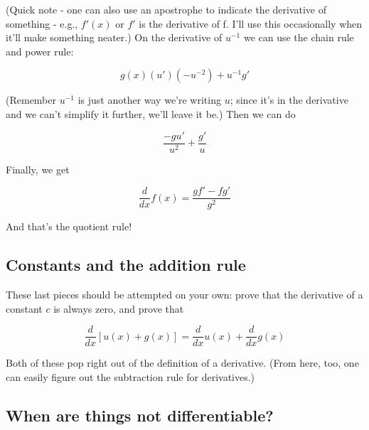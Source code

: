 (Quick note - one can also use an apostrophe to indicate the derivative of something - e.g., $f'(x)$ or $f'$ is the derivative of f. I'll use this occasionally when it'll make something neater.) On the derivative of $u^{-1}$ we can use the chain rule and power rule:

\begin{equation*}
    g(x)(u')(-u^{-2})+u^{-1}g'
\end{equation*}

(Remember $u^{-1}$ is just another way we're writing $u$; since it's in the derivative and we can't simplify it further, we'll leave it be.) Then we can do

\begin{equation*}
    \frac{-gu'}{u^2}+\frac{g'}{u}
\end{equation*}

Finally, we get

\begin{equation*}
    \frac{d}{dx}f(x) = \frac{gf' - fg'}{g^2}
\end{equation*}

And that's the quotient rule!

\subsection{Constants and the addition rule}

These last pieces should be attempted on your own: prove that the derivative of a constant $c$ is always zero, and prove that 

\begin{equation*}
    \frac{d}{dx}\left[u(x) + g(x)\right] = \frac{d}{dx}u(x) + \frac{d}{dx}g(x)
\end{equation*}

Both of these pop right out of the definition of a derivative. (From here, too, one can easily figure out the subtraction rule for derivatives.)

\subsection{When are things not differentiable?}

